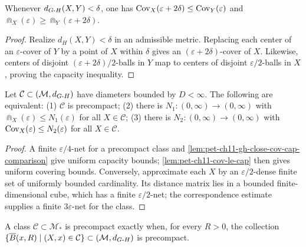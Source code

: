 \begin{lemma}
  \label{lem:pet-ch11-gh-close-cov-cap-comparison}
  Whenever $d_{G\text{-}H}(X,Y)<\delta$, one has
  $\operatorname{Cov}_X(\varepsilon+2\delta)\le\operatorname{Cov}_Y(\varepsilon)$ and
  $\Cap_X(\varepsilon)\ge\Cap_Y(\varepsilon+2\delta)$.
\end{lemma}
\begin{proof}
  \sketch
  Realize \(d_H(X,Y)<\delta\) in an admissible metric. Replacing each center
  of an \(\varepsilon\)-cover of \(Y\) by a point of \(X\) within \(\delta\)
  gives an \((\varepsilon+2\delta)\)-cover of \(X\). Likewise, centers of
  disjoint \((\varepsilon+2\delta)/2\)-balls in \(Y\) map to centers of
  disjoint \(\varepsilon/2\)-balls in \(X\), proving the capacity inequality.
\end{proof}


\begin{proposition}
  \label{prop:pet-ch11-gromov-precompactness-criterion}
  Let $\mathcal{C}\subset(\mathcal{M},d_{G\text{-}H})$ have diameters bounded by
  $D<\infty$. The following are equivalent: (1) $\mathcal{C}$ is precompact;
  (2) there is
  $N_1:(0,\infty)\to(0,\infty)$ with $\Cap_X(\varepsilon)\le N_1(\varepsilon)$
  for all $X\in\mathcal{C}$; (3) there is $N_2:(0,\infty)\to(0,\infty)$ with
  $\operatorname{Cov}_X(\varepsilon)\le N_2(\varepsilon)$ for all $X\in\mathcal{C}$.
\end{proposition}
\begin{proof}
  \sketch
  A finite \(\varepsilon/4\)-net for a precompact class and
  \cref{lem:pet-ch11-gh-close-cov-cap-comparison} give uniform capacity
  bounds; \cref{lem:pet-ch11-cov-le-cap} then gives uniform covering bounds.
  Conversely, approximate each \(X\) by an \(\varepsilon/2\)-dense finite set
  of uniformly bounded cardinality. Its distance matrix lies in a bounded
  finite-dimensional cube, which has a finite \(\varepsilon/2\)-net; the
  correspondence estimate supplies a finite \(3\varepsilon\)-net for the class.
\end{proof}


\begin{corollary}
  \label{cor:pet-ch11-pointed-precompactness-criterion}
  A class $\mathcal{C}\subset\mathcal{M}_*$ is precompact exactly when, for
  every $R>0$, the
  collection $\{\overline{B}(x,R)\mid(X,x)\in\mathcal{C}\}\subset(\mathcal{M},d_{G\text{-}H})$
  is precompact.
\end{corollary}

